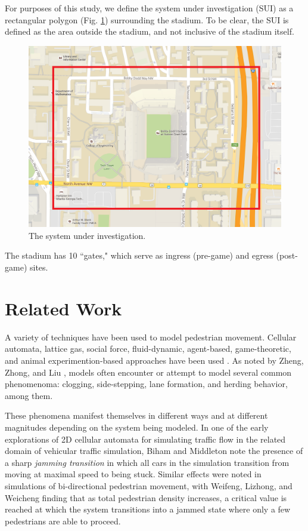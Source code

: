 \documentclass[12pt]{article}
\begin{document}
For purposes of this study, we define the system under investigation (SUI) as a
rectangular polygon (Fig. \ref{fig:polygon}) surrounding the stadium. To be clear,
the SUI is defined as the area outside the stadium, and not inclusive of the
stadium itself.

\begin{figure}[H]
  \includegraphics[width=\linewidth,natwidth=1036,natheight=742]{cropped_map.png}
  \caption{The system under investigation.}
  \label{fig:polygon}
\end{figure}

The stadium has 10 ``gates," which serve as ingress (pre-game) and egress
(post-game) sites.


\section{Related Work}
\label{sec:literature}

A variety of techniques have been used to model pedestrian movement. Cellular
automata, lattice gas, social force, fluid-dynamic, agent-based, game-theoretic,
and animal experimention-based approaches have been used
\cite{zheng2009modeling}. As noted by Zheng, Zhong, and Liu
\cite{zheng2009modeling}, models often encounter or attempt to model several
common phenomenoma: clogging, side-stepping, lane formation, and herding
behavior, among them.

These phenomena manifest themselves in different ways and at different
magnitudes depending on the system being modeled. In one of the early
explorations of 2D cellular automata for simulating traffic flow in the related
domain of vehicular traffic simulation, Biham and Middleton \cite{biham1992self}
note the presence of a sharp
\textit{jamming transition} in which all cars in the simulation transition from
moving at maximal speed to being stuck. Similar effects were noted in
simulations of bi-directional pedestrian movement, with Weifeng, Lizhong, and
Weicheng \cite{weifeng2003simulation} finding that as total pedestrian density
increases, a critical value is reached at which the system transitions into a
jammed state where only a few pedestrians are able to proceed.
\end{document}

